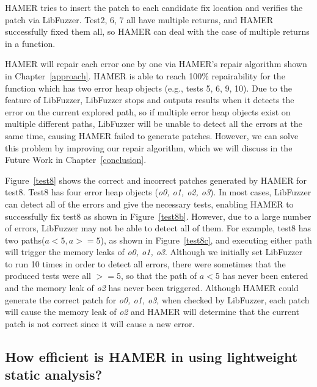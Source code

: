 \documentclass[a4paper,11pt,oneside,openany]{book}
\begin{document}
HAMER tries to insert the patch to each candidate fix location and verifies the patch via LibFuzzer. Test2, 6, 7 all have multiple returns, and HAMER successfully fixed them all, so HAMER can deal with the case of multiple returns in a function.

HAMER will repair each error one by one via HAMER's repair algorithm shown in Chapter~\ref{approach}. HAMER is able to reach 100\% repairability for the function which has two error heap objects (e.g., tests 5, 6, 9, 10). Due to the feature of LibFuzzer, LibFuzzer stops and outputs results when it detects the error on the current explored path, so if multiple error heap objects exist on multiple different paths, LibFuzzer will be unable to detect all the errors at the same time, causing HAMER failed to generate patches. However, we can solve this problem by improving our repair algorithm, which we will discuss in the Future Work in Chapter~\ref{conclusion}.

Figure~\ref{test8} shows the correct and incorrect patches generated by HAMER for test8. Test8 has four error heap objects ({\it o0, o1, o2, o3}). In most cases, LibFuzzer can detect all of the errors and give the necessary tests, enabling HAMER to successfully fix test8 as shown in Figure~\ref{test8b}. However, due to a large number of errors, LibFuzzer may not be able to detect all of them. For example, test8 has two paths($a<5, a>=5$), as shown in Figure~\ref{test8c}, and executing either path will trigger the memory leaks of {\it o0, o1, o3}. Although we initially set LibFuzzer to run 10 times in order to detect all errors, there were sometimes that the produced tests were all $>=5$, so that the path of $a<5$ has never been entered and the memory leak of {\it o2} has never been triggered. Although HAMER could generate the correct patch for {\it o0, o1, o3}, when checked by LibFuzzer, each patch will cause the memory leak of {\it o2} and HAMER will determine that the current patch is not correct since it will cause a new error.

\subsection[Research Question 3]{How efficient is HAMER in using lightweight static analysis?}

\end{document}
